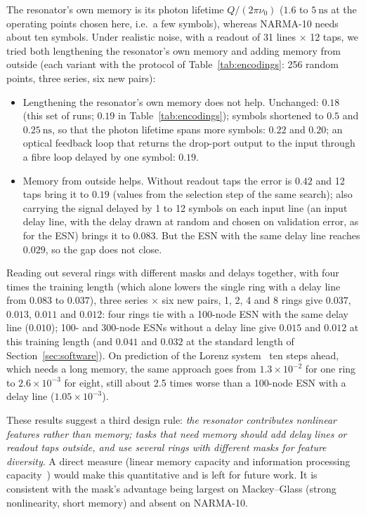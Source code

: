 The resonator's own memory is its photon lifetime $Q/(2\pi\nu_0)$ ($1.6$ to $5~\mathrm{ns}$ at the operating points chosen here, i.e.\ a
few symbols), whereas NARMA-10 needs about ten symbols. Under realistic noise, with a readout of 31 lines $\times$ 12 taps, we tried
both lengthening the resonator's own memory and adding memory from outside (each variant with the protocol of
Table~\ref{tab:encodings}: 256 random points, three series, six new pairs):
\begin{itemize}
\item Lengthening the resonator's own memory does not help. Unchanged: $0.18$ (this set of runs; $0.19$ in Table~\ref{tab:encodings});
      symbols shortened to $0.5$ and $0.25~\mathrm{ns}$, so
      that the photon lifetime spans more symbols: $0.22$ and $0.20$; an optical feedback loop that returns the drop-port output to
      the input through a fibre loop delayed by one symbol: $0.19$.
\item Memory from outside helps. Without readout taps the error is $0.42$ and 12 taps bring it to $0.19$ (values from the selection
      step of the same search); also carrying the signal delayed by 1 to 12 symbols on each input line (an input delay line, with the
      delay drawn at random and chosen on validation error, as for the ESN) brings it to $0.083$. But the ESN with the same delay line
      reaches $0.029$, so the gap does not close.
\end{itemize}
Reading out several rings with different masks and delays together, with four times the training length (which alone lowers the
single ring with a delay line from $0.083$ to $0.037$), three series $\times$ six new pairs, 1, 2, 4 and 8 rings give $0.037$,
$0.013$, $0.011$ and $0.012$: four rings tie with a 100-node ESN with the same delay line ($0.010$); 100- and 300-node ESNs without a
delay line give $0.015$ and $0.012$ at this training length (and $0.041$ and $0.032$ at the standard length of
Section~\ref{sec:software}). On prediction of the Lorenz system~\cite{lorenz1963} ten steps ahead, which needs a long memory, the same approach goes from
$1.3\times10^{-2}$ for one ring to $2.6\times10^{-3}$ for eight, still about 2.5 times worse than a 100-node ESN with a delay line
($1.05\times10^{-3}$).

These results suggest a third design rule: \emph{the resonator contributes nonlinear features rather than memory; tasks that need memory
should add delay lines or readout taps outside, and use several rings with different masks for feature diversity}. A direct measure
(linear memory capacity and information processing capacity~\cite{dambre2012}) would make this quantitative and is left for future
work. It is consistent with the mask's advantage being largest on Mackey--Glass (strong nonlinearity, short memory) and absent on
NARMA-10.

